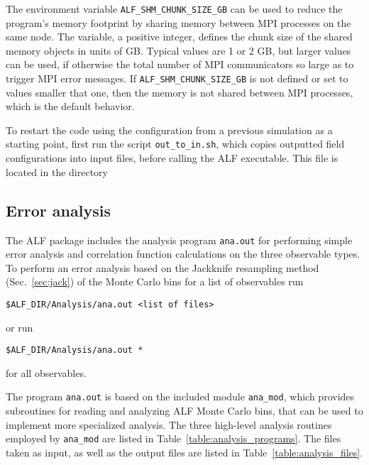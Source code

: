 \noindent The environment variable \texttt{ALF\_SHM\_CHUNK\_SIZE\_GB} can be used to reduce the program's memory footprint by sharing memory between MPI processes on the same node. The variable, a positive integer, defines the chunk size of the shared memory objects in units of GB.
Typical values are 1 or 2 GB, but larger values can be used, if otherwise the total number of MPI communicators so large as to trigger MPI error messages.
If \texttt{ALF\_SHM\_CHUNK\_SIZE\_GB} is not defined or set to values smaller that one, then the memory is not shared between MPI processes, which is the default behavior.

To restart the code using the configuration from a previous simulation as a starting point, first run the script \texttt{out\_to\_in.sh}, which copies outputted field configurations into input files, before calling the ALF executable.   This file is located in the  directory 

%
\subsection{Error analysis}\label{sec:analysis}
%

The ALF package includes the analysis program \texttt{ana.out} for performing simple error analysis and correlation function calculations on the three observable types. To perform an error analysis based on the Jackknife resampling method~\cite{efron1981} (Sec.~\ref{sec:jack}) of the Monte Carlo bins for a list of observables run
\begin{lstlisting}[style=bash]
$ALF_DIR/Analysis/ana.out <list of files>
\end{lstlisting}
or run
\begin{lstlisting}[style=bash]
$ALF_DIR/Analysis/ana.out *
\end{lstlisting}
for all observables.

The program \texttt{ana.out} is based on the included module \texttt{ana\_mod}, which provides subroutines for reading and analyzing ALF Monte Carlo bins, that can be used to implement more specialized analysis. The three high-level analysis routines employed by \texttt{ana\_mod} are listed in Table~\ref{table:analysis_programs}. The files taken as input, as well as the output files are listed in Table~\ref{table:analysis_files}.

